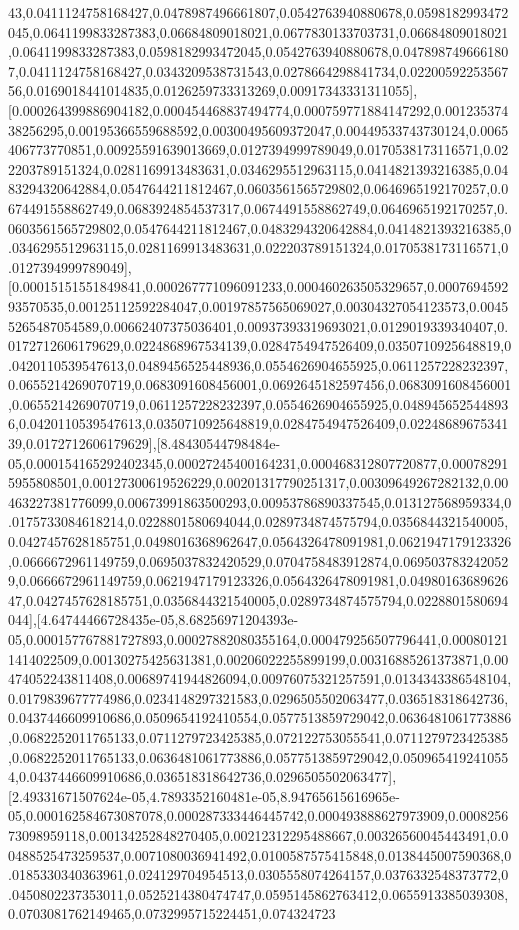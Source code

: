 \documentclass{article}
\begin{document}
43,0.0411124758168427,0.0478987496661807,0.0542763940880678,0.0598182993472045,0.0641199833287383,0.06684809018021,0.0677830133703731,0.06684809018021,0.0641199833287383,0.0598182993472045,0.0542763940880678,0.0478987496661807,0.0411124758168427,0.0343209538731543,0.0278664298841734,0.0220059225356756,0.0169018441014835,0.0126259733313269,0.00917343331311055],[0.000264399886904182,0.000454468837494774,0.000759771884147292,0.00123537438256295,0.00195366559688592,0.00300495609372047,0.00449533743730124,0.0065406773770851,0.00925591639013669,0.0127394999789049,0.0170538173116571,0.022203789151324,0.0281169913483631,0.0346295512963115,0.0414821393216385,0.0483294320642884,0.0547644211812467,0.0603561565729802,0.0646965192170257,0.0674491558862749,0.0683924854537317,0.0674491558862749,0.0646965192170257,0.0603561565729802,0.0547644211812467,0.0483294320642884,0.0414821393216385,0.0346295512963115,0.0281169913483631,0.022203789151324,0.0170538173116571,0.0127394999789049],[0.00015151551849841,0.000267771096091233,0.000460263505329657,0.000769459293570535,0.00125112592284047,0.00197857565069027,0.00304327054123573,0.00455265487054589,0.00662407375036401,0.00937393319693021,0.0129019339340407,0.0172712606179629,0.0224868967534139,0.0284754947526409,0.0350710925648819,0.0420110539547613,0.0489456525448936,0.0554626904655925,0.0611257228232397,0.0655214269070719,0.0683091608456001,0.0692645182597456,0.0683091608456001,0.0655214269070719,0.0611257228232397,0.0554626904655925,0.0489456525448936,0.0420110539547613,0.0350710925648819,0.0284754947526409,0.0224868967534139,0.0172712606179629],[8.48430544798484e-05,0.000154165292402345,0.00027245400164231,0.000468312807720877,0.000782915955808501,0.00127300619526229,0.00201317790251317,0.00309649267282132,0.00463227381776099,0.00673991863500293,0.00953786890337545,0.013127568959334,0.0175733084618214,0.0228801580694044,0.0289734874575794,0.0356844321540005,0.0427457628185751,0.0498016368962647,0.0564326478091981,0.0621947179123326,0.0666672961149759,0.0695037832420529,0.0704758483912874,0.0695037832420529,0.0666672961149759,0.0621947179123326,0.0564326478091981,0.0498016368962647,0.0427457628185751,0.0356844321540005,0.0289734874575794,0.0228801580694044],[4.64744466728435e-05,8.68256971204393e-05,0.000157767881727893,0.00027882080355164,0.000479256507796441,0.000801211414022509,0.00130275425631381,0.00206022255899199,0.00316885261373871,0.00474052243811408,0.00689741944826094,0.00976075321257591,0.0134343386548104,0.0179839677774986,0.0234148297321583,0.0296505502063477,0.036518318642736,0.0437446609910686,0.0509654192410554,0.0577513859729042,0.0636481061773886,0.0682252011765133,0.0711279723425385,0.072122753055541,0.0711279723425385,0.0682252011765133,0.0636481061773886,0.0577513859729042,0.0509654192410554,0.0437446609910686,0.036518318642736,0.0296505502063477],[2.49331671507624e-05,4.7893352160481e-05,8.94765615616965e-05,0.000162584673087078,0.000287333446445742,0.000493888627973909,0.000825673098959118,0.00134252848270405,0.00212312295488667,0.00326560045443491,0.00488525473259537,0.0071080036941492,0.0100587575415848,0.0138445007590368,0.0185330340363961,0.024129704954513,0.0305558074264157,0.0376332548373772,0.0450802237353011,0.0525214380474747,0.0595145862763412,0.0655913385039308,0.0703081762149465,0.0732995715224451,0.074324723
\end{document}
